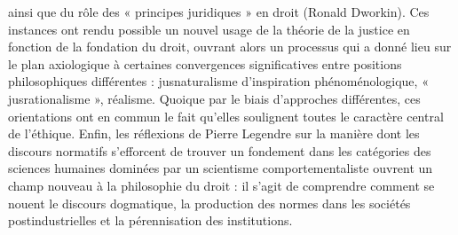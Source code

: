 ainsi que du rôle des « principes juridiques » en droit (Ronald Dworkin). Ces
instances ont rendu possible un nouvel
usage de la théorie de la justice en fonction de la fondation du droit, ouvrant
alors un processus qui a donné lieu sur
le plan axiologique à certaines convergences significatives entre positions philosophiques différentes : jusnaturalisme
d'inspiration phénoménologique, « jusrationalisme », réalisme. Quoique par le
biais d’approches différentes, ces orientations ont en commun le fait qu’elles soulignent toutes le caractère central de
l'éthique. Enfin, les réflexions de Pierre
Legendre sur la manière dont les discours
normatifs s'efforcent de trouver un fondement dans les catégories des sciences
humaines dominées par un scientisme
comportementaliste ouvrent un champ
nouveau à la philosophie du droit : il
s’agit de comprendre comment se nouent
le discours dogmatique, la production des
normes dans les sociétés postindustrielles
et la pérennisation des institutions.


